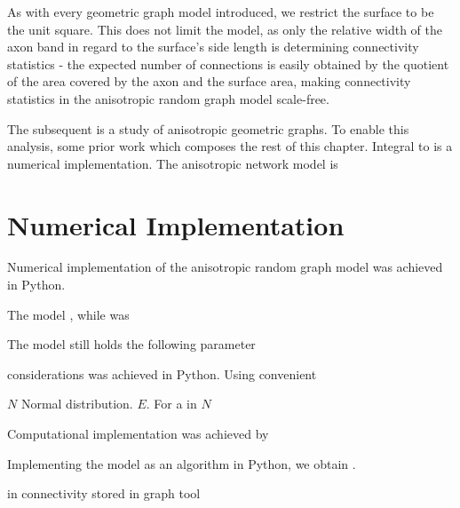 \begin{remark}
  As with every geometric graph model introduced, we restrict the
  surface to be the unit square. This does not limit the model, as
  only the relative width of the axon band in regard to the surface's
  side length is determining connectivity statistics -
  the expected number of connections is easily obtained by the
  quotient of the area covered by the axon and the surface area,
  making connectivity statistics in the anisotropic random graph
  model scale-free.
\end{remark}


The subsequent is a study of anisotropic geometric graphs. To enable
this analysis, some prior work which composes the rest of this
chapter. Integral to is a numerical implementation. The anisotropic
network model is 








\section{Numerical Implementation}\label{numerical_implementation}

Numerical implementation of the anisotropic random graph model was
achieved in Python.

The model , while was

The model still holds the following parameter


considerations was achieved in Python. Using convenient 



$N$ Normal distribution. $E$. For a in $N$ 

Computational implementation was achieved by 




Implementing the model as an algorithm in Python, we obtain .

 in connectivity stored in graph
tool \parencite{graph_tool} %

